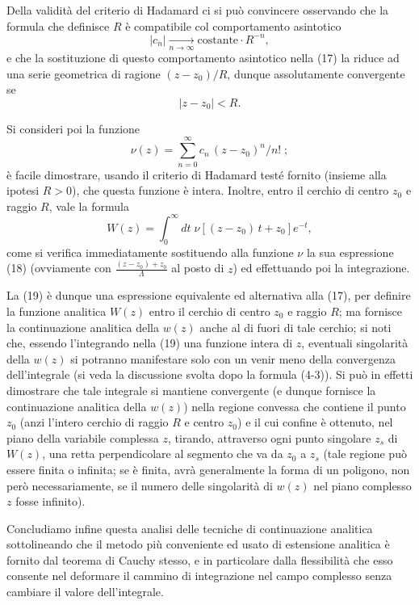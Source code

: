 \documentclass[11pt, a4paper]{book}
\numberwithin{equation}{section}
\begin{document}
Della validità del criterio di Hadamard ci si può convincere osservando che la formula che definisce $R$ è compatibile col comportamento asintotico
\[
|c_n| \xrightarrow[n \to \infty]{} \text{costante} \cdot R^{-n},
\]
e che la sostituzione di questo comportamento asintotico nella (17) la riduce ad una serie geometrica di ragione $(z - z_0)/R$, dunque assolutamente convergente se
\[
|z - z_0| < R.
\]

Si consideri poi la funzione
\begin{equation}
\nu(z) = \sum_{n=0}^{\infty} c_n\,(z - z_0)^n \big/ n! \;; \tag{18}
\end{equation}
è facile dimostrare, usando il criterio di Hadamard testé fornito (insieme alla ipotesi $R>0$), che questa funzione è intera. Inoltre, entro il cerchio di centro $z_0$ e raggio $R$, vale la formula
\begin{equation}
W(z) = \int_0^{\infty} dt\; \nu\!\left[(z - z_0)\,t + z_0\right] e^{-t}, \tag{19}
\end{equation}
come si verifica immediatamente sostituendo alla funzione $\nu$ la sua espressione (18) (ovviamente con $\frac{(z-z_0)+z_0}{\Lambda}$ %
al posto di $z$) ed effettuando poi la integrazione.

La (19) è dunque una espressione equivalente ed alternativa alla (17), per definire la funzione analitica $W(z)$ entro il cerchio di centro $z_0$ e raggio $R$; ma fornisce la continuazione analitica della $w(z)$ anche al di fuori di tale cerchio; si noti che, essendo l'integrando nella (19) una funzione intera di $z$, eventuali singolarità della $w(z)$ si potranno manifestare solo con un venir meno della convergenza dell'integrale (si veda la discussione svolta dopo la formula (4-3)). Si può in effetti dimostrare che tale integrale si mantiene convergente (e dunque fornisce la continuazione analitica della $w(z)$) nella regione convessa che contiene il punto $z_0$ (anzi l'intero cerchio di raggio $R$ e centro $z_0$) e il cui confine è ottenuto, nel piano della variabile complessa $z$, tirando, attraverso ogni punto singolare $z_s$ di $W(z)$, una retta perpendicolare al segmento che va da $z_0$ a $z_s$ (tale regione può essere finita o infinita; se è finita, avrà generalmente la forma di un poligono, non però necessariamente, se il numero delle singolarità di $w(z)$ nel piano complesso $z$ fosse infinito).

Concludiamo infine questa analisi delle tecniche di continuazione analitica sottolineando che il metodo più conveniente ed usato di estensione analitica è fornito dal teorema di Cauchy stesso, e in particolare dalla flessibilità che esso consente nel deformare il cammino di integrazione nel campo complesso senza cambiare il valore dell'integrale.
\end{document}

